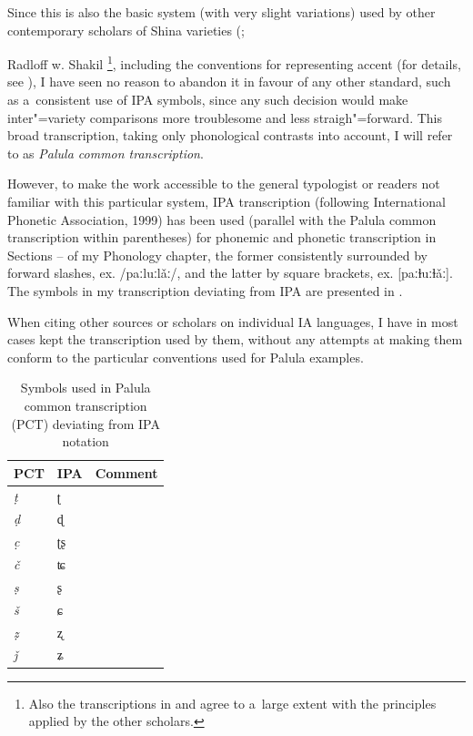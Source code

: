 Since this is also the basic system (with very slight variations) used by other contemporary
scholars of Shina varieties
(\citealt{buddruss1987,buddruss1993,buddruss1996,schmidtkohistani2001,schmidtkohistani2008,schmidt2000,schmidt2001,schmidt2002,schmidt2003,schmidt2004,radloff1992,radloff1999};
{Radloff w. Shakil \citeyear{radloffshakil1998}\footnote{Also the transcriptions in
    \citet{hook1990a,hook1996} and \citet{hookzia1987} agree to a~large extent with the principles
    applied by the other scholars.}, including the conventions for representing accent (for details,
  see ), I have seen no reason to abandon it in favour of any other standard, such as
  a~consistent use of IPA symbols, since any such decision would make inter"=variety comparisons more
  troublesome and less straigh"=forward. This broad transcription, taking only phonological contrasts
  into account, I will refer to as \textit{Palula common transcription}.


However, to make the work accessible to the general typologist or readers not familiar with this
particular system, IPA transcription (following International Phonetic Association, 1999) has been
used (parallel with the Palula common transcription within parentheses) for phonemic and phonetic
transcription in Sections -- of my Phonology chapter, the former consistently surrounded
by forward slashes, ex. /paːluːlǎː/, and the latter by square brackets, ex. [paːɫuːɫǎː]. The
symbols in my transcription deviating from IPA are presented in .


When citing other sources or scholars on individual IA languages, I have in most cases kept the
transcription used by them, without any attempts at making them conform to the particular
conventions used for Palula examples.


\begin{table}[ht]
\caption{Symbols used in Palula common transcription (PCT) deviating from IPA notation}
\begin{tabularx}{.8\textwidth}{ l l | Q }
\lsptoprule
PCT &
IPA &
Comment\\\hline
\textit{ṭ} &
ʈ &
\\
\textit{ḍ} &
ɖ &
\\
\textit{c̣} &
ʈʂ &
\\
\textit{č} &
ʨ &
\\
\textit{ṣ} &
ʂ &
\\
\textit{š} &
ɕ &
\\
\textit{ẓ} &
ʐ &
\\
\textit{ǰ} &
ʑ &\\



\end{tabularx}
\end{table}}
